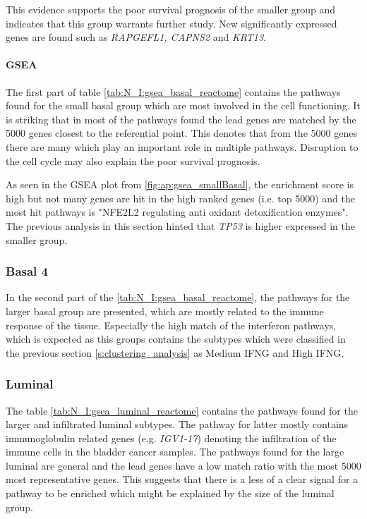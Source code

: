 This evidence supports the poor survival prognosis of the smaller group and indicates that this group warrants further study. New significantly expressed genes are found such as \textit{RAPGEFL1, CAPNS2} and \textit{KRT13}.


\paragraph*{GSEA}

The first part of table \cref{tab:N_I:gsea_basal_reactome} contains the pathways found for the small basal group which are most involved in the cell functioning. It is striking that in most of the pathways found the lead genes are matched by the 5000 genes closest to the referential point. This denotes that from the 5000 genes there are many which play an important role in multiple pathways. Disruption to the cell cycle may also explain the poor survival prognosis. 

As seen in the GSEA plot from \cref{fig:ap:gsea_smallBasal}, the enrichment score is high but not many genes are hit in the high ranked genes (i.e. top 5000) and the most hit pathways is "NFE2L2 regulating anti oxidant detoxification enzymes". The previous analysis in this section hinted that \textit{TP53} is higher expressed in the smaller group. 

\subsubsection* {Basal 4}

In the second part of the \cref{tab:N_I:gsea_basal_reactome}, the pathways for the larger basal group are presented, which are mostly related to the immune response of the tissue. Especially the high match of the interferon pathways, which is expected as this groups contains the subtypes which were classified in the previous section \cref{s:clustering_analysis} as Medium IFNG and High IFNG. 


\subsubsection*{Luminal}

The table \cref{tab:N_I:gsea_luminal_reactome} contains the pathways found for the larger and infiltrated luminal subtypes. The pathway for latter mostly contains immunoglobulin related genes (e.g. \textit{IGV1-17}) denoting the infiltration of the immune cells in the bladder cancer samples. The pathways found for the large luminal are general and the lead genes have a low match ratio with the most 5000 most representative genes. This suggests that there is a less of a clear signal for a pathway to be enriched which might be explained by the size of the luminal group. 

